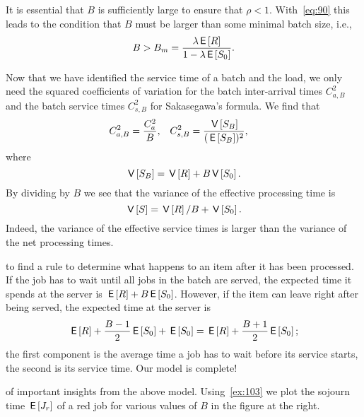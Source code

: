 It is essential that $B$ is sufficiently large to ensure that $\rho<1$.
With~\cref{eq:90} this leads to the condition that $B$ must be larger than some minimal batch size, i.e.,
\begin{equation*}
B> B_m = \frac{\lambda \,\mathsf{E}\left[R\right]}{1-\lambda \,\mathsf{E}\left[S_0\right]}.
\end{equation*}

Now that we have identified the service time of a batch and the load, we only need the squared coefficients of variation for the batch inter-arrival times $C_{a,B}^2$ and the batch service times $C_{s,B}^2$ for Sakasegawa's formula.
We find that
 \begin{align}\label{eq:82}
C_{a,B}^2 &= \frac{C_{a}^2}B, &
C_{s, B}^2 &= \frac{\,\mathsf{V}\left[S_B\right]}{(\,\mathsf{E}\left[S_B\right])^2},
\end{align}
where
\begin{equation*}
  \,\mathsf{V}\left[S_B\right] = \,\mathsf{V}\left[R\right]  + B \,\mathsf{V}\left[S_0\right].
\end{equation*}
By dividing by $B$ we see that the variance of the effective processing time is
\begin{equation}  \label{eq:107}
  \V{S} %
  = \V R / B + \V{S_{0}}.
\end{equation}
Indeed, the variance of the effective service times is larger than the variance of the net processing times.

 to find a rule to determine what happens to an item after it has been processed.
If the job has to wait until all jobs in the batch are served, the expected time it spends at the server is $\,\mathsf{E}\left[R\right] + B \,\mathsf{E}\left[S_0\right]$.
However, if the item can leave
right after being served, the expected time at the server is
\begin{equation}\label{eq:85}
\,\mathsf{E}\left[R\right] + \frac{B-1}{2}\,\mathsf{E}\left[S_0\right] + \,\mathsf{E}\left[S_0\right]= \,\mathsf{E}\left[R\right] + \frac{B+1}{2}\,\mathsf{E}\left[S_0\right];
\end{equation}
the first component is the average time a job has to wait before its service starts, the second is its service time.
Our model is complete!



 of important insights from the above model.
Using~\cref{ex:103} we plot the sojourn time $\,\mathsf{E}\left[J_r\right]$ of a red job for various values of $B$ in the figure at the right.


